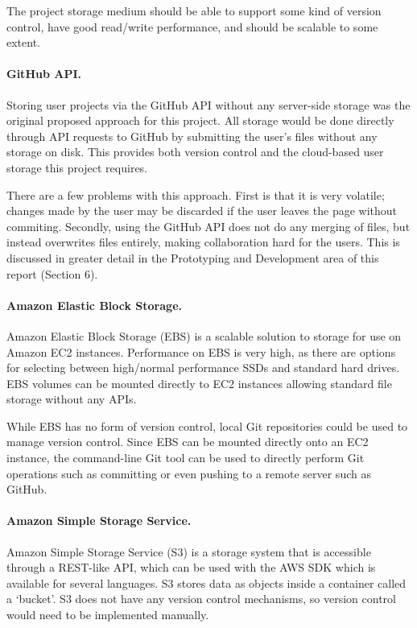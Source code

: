 \documentclass[a4paper, 12pt]{article}
\begin{document}
The project storage medium should be able to support some kind of version control, have good read/write performance, and should be scalable to some extent.

\paragraph{GitHub API.}
Storing user projects via the GitHub API without any server-side storage was the original proposed approach for this project. All storage would be done directly through API requests to GitHub by submitting the user's files without any storage on disk. This provides both version control and the cloud-based user storage this project requires.


There are a few problems with this approach. First is that it is very volatile; changes made by the user may be discarded if the user leaves the page without commiting. Secondly, using the GitHub API does not do any merging of files, but instead overwrites files entirely, making collaboration hard for the users. This is discussed in greater detail in the Prototyping and Development area of this report (Section 6).


\paragraph{Amazon Elastic Block Storage.}
Amazon Elastic Block Storage (EBS) is a scalable solution to storage for use on Amazon EC2 instances. Performance on EBS is very high, as there are options for selecting between high/normal performance SSDs and standard hard drives. EBS volumes can be mounted directly to EC2 instances allowing standard file storage without any APIs.


While EBS has no form of version control, local Git repositories could be used to manage version control. Since EBS can be mounted directly onto an EC2 instance, the command-line Git tool can be used to directly perform Git operations such as committing or even pushing to a remote server such as GitHub.


\paragraph{Amazon Simple Storage Service.}
Amazon Simple Storage Service (S3) is a storage system that is accessible through a REST-like API, which can be used with the AWS SDK which is available for several languages. S3 stores data as objects inside a container called a `bucket'. S3 does not have any version control mechanisms, so version control would need to be implemented manually.
\end{document}
